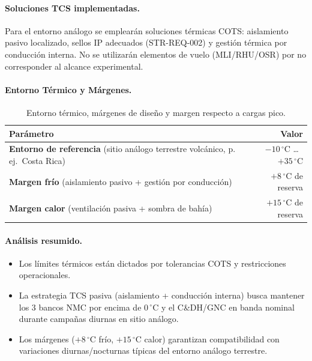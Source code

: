 \paragraph{Soluciones TCS implementadas.}

Para el entorno análogo se emplearán soluciones térmicas COTS: aislamiento pasivo localizado, sellos IP adecuados (STR-REQ-002) y gestión térmica por conducción interna. No se utilizarán elementos de vuelo (MLI/RHU/OSR) por no corresponder al alcance experimental.

\paragraph{Entorno Térmico y Márgenes.}

\begin{table}[H]
\centering
\caption{Entorno térmico, márgenes de diseño y margen respecto a cargas pico.}
\renewcommand{\arraystretch}{1.25}
\begin{tabular}{p{6.5cm} r}
\hline
\textbf{Parámetro} & \textbf{Valor} \\
\hline
\textbf{Entorno de referencia} (sitio análogo terrestre volcánico, p.\,ej.\ Costa Rica) & \(-10\,^{\circ}\mathrm{C}\) \dots \ \(+35\,^{\circ}\mathrm{C}\) \\
\textbf{Margen frío} (aislamiento pasivo + gestión por conducción) & \(+8\,^{\circ}\mathrm{C}\) de reserva \\
\textbf{Margen calor} (ventilación pasiva + sombra de bahía) & \(+15\,^{\circ}\mathrm{C}\) de reserva \\
\hline
\end{tabular}
\end{table}

\paragraph{Análisis resumido.}
\begin{itemize}
    \item Los límites térmicos están dictados por tolerancias COTS y restricciones operacionales.
    \item La estrategia TCS pasiva (aislamiento + conducción interna) busca mantener los 3 bancos NMC por encima de \(0\,^{\circ}\mathrm{C}\) y el C\&DH/GNC en banda nominal durante campañas diurnas en sitio análogo.
    \item Los márgenes (\(+8\,^{\circ}\mathrm{C}\) frío, \(+15\,^{\circ}\mathrm{C}\) calor) garantizan compatibilidad con variaciones diurnas/nocturnas típicas del entorno análogo terrestre.
\end{itemize}



